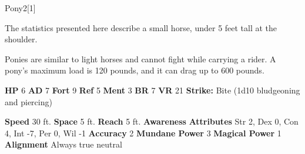   \begin{monsection}{Pony}{2}[1]
    \vspace{-1em}\vspace{-1em}
    \vspace{0em}

    
      The statistics presented here describe a small horse, under 5 feet tall at the shoulder.
    
        Ponies are similar to light horses and cannot fight while carrying a rider.
        A pony's maximum load is 120 pounds, and it can drag up to 600 pounds.
      

    \begin{spellcontent}
      \begin{spelltargetinginfo}
        \pari \textbf{HP} 6 \monsep
          \textbf{AD} 7 \monsep
          \textbf{Fort} 9 \monsep
          \textbf{Ref} 5 \monsep
          \textbf{Ment} 3
        \pari \textbf{BR} 7 \monsep
        \textbf{VR} 21
        \pari \textbf{Strike:}
            Bite  (1d10 bludgeoning and piercing)
      \end{spelltargetinginfo}
    \end{spellcontent}
    \begin{monsterfooter}
      \pari \textbf{Speed} 30 ft. \monsep
        \textbf{Space} 5 ft. \monsep
        \textbf{Reach} 5 ft.
      \pari \textbf{Awareness} 
      \pari \textbf{Attributes}
        Str 2, Dex 0,
        Con 4, Int -7,
        Per 0, Wil -1
      \pari \textbf{Accuracy} 2 \monsep
        \textbf{Mundane Power} 3 \monsep
      \textbf{Magical Power} 1
      \pari \textbf{Alignment} Always true neutral
    \end{monsterfooter}
  \end{monsection}
  
